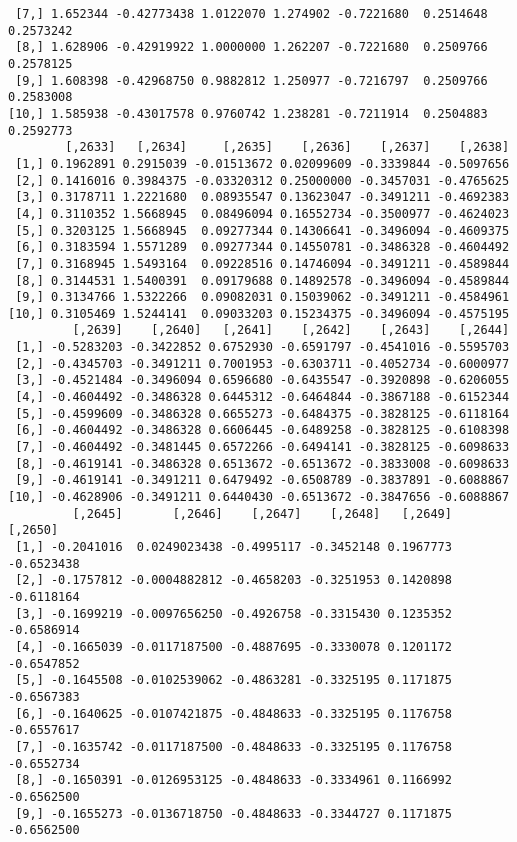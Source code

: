 \documentclass[
  letterpaper,
  DIV=11,
  numbers=noendperiod]{scrreprt}
\begin{document}
\begin{verbatim}
 [7,] 1.652344 -0.42773438 1.0122070 1.274902 -0.7221680  0.2514648  0.2573242
 [8,] 1.628906 -0.42919922 1.0000000 1.262207 -0.7221680  0.2509766  0.2578125
 [9,] 1.608398 -0.42968750 0.9882812 1.250977 -0.7216797  0.2509766  0.2583008
[10,] 1.585938 -0.43017578 0.9760742 1.238281 -0.7211914  0.2504883  0.2592773
        [,2633]   [,2634]     [,2635]    [,2636]    [,2637]    [,2638]
 [1,] 0.1962891 0.2915039 -0.01513672 0.02099609 -0.3339844 -0.5097656
 [2,] 0.1416016 0.3984375 -0.03320312 0.25000000 -0.3457031 -0.4765625
 [3,] 0.3178711 1.2221680  0.08935547 0.13623047 -0.3491211 -0.4692383
 [4,] 0.3110352 1.5668945  0.08496094 0.16552734 -0.3500977 -0.4624023
 [5,] 0.3203125 1.5668945  0.09277344 0.14306641 -0.3496094 -0.4609375
 [6,] 0.3183594 1.5571289  0.09277344 0.14550781 -0.3486328 -0.4604492
 [7,] 0.3168945 1.5493164  0.09228516 0.14746094 -0.3491211 -0.4589844
 [8,] 0.3144531 1.5400391  0.09179688 0.14892578 -0.3496094 -0.4589844
 [9,] 0.3134766 1.5322266  0.09082031 0.15039062 -0.3491211 -0.4584961
[10,] 0.3105469 1.5244141  0.09033203 0.15234375 -0.3496094 -0.4575195
         [,2639]    [,2640]   [,2641]    [,2642]    [,2643]    [,2644]
 [1,] -0.5283203 -0.3422852 0.6752930 -0.6591797 -0.4541016 -0.5595703
 [2,] -0.4345703 -0.3491211 0.7001953 -0.6303711 -0.4052734 -0.6000977
 [3,] -0.4521484 -0.3496094 0.6596680 -0.6435547 -0.3920898 -0.6206055
 [4,] -0.4604492 -0.3486328 0.6445312 -0.6464844 -0.3867188 -0.6152344
 [5,] -0.4599609 -0.3486328 0.6655273 -0.6484375 -0.3828125 -0.6118164
 [6,] -0.4604492 -0.3486328 0.6606445 -0.6489258 -0.3828125 -0.6108398
 [7,] -0.4604492 -0.3481445 0.6572266 -0.6494141 -0.3828125 -0.6098633
 [8,] -0.4619141 -0.3486328 0.6513672 -0.6513672 -0.3833008 -0.6098633
 [9,] -0.4619141 -0.3491211 0.6479492 -0.6508789 -0.3837891 -0.6088867
[10,] -0.4628906 -0.3491211 0.6440430 -0.6513672 -0.3847656 -0.6088867
         [,2645]       [,2646]    [,2647]    [,2648]   [,2649]    [,2650]
 [1,] -0.2041016  0.0249023438 -0.4995117 -0.3452148 0.1967773 -0.6523438
 [2,] -0.1757812 -0.0004882812 -0.4658203 -0.3251953 0.1420898 -0.6118164
 [3,] -0.1699219 -0.0097656250 -0.4926758 -0.3315430 0.1235352 -0.6586914
 [4,] -0.1665039 -0.0117187500 -0.4887695 -0.3330078 0.1201172 -0.6547852
 [5,] -0.1645508 -0.0102539062 -0.4863281 -0.3325195 0.1171875 -0.6567383
 [6,] -0.1640625 -0.0107421875 -0.4848633 -0.3325195 0.1176758 -0.6557617
 [7,] -0.1635742 -0.0117187500 -0.4848633 -0.3325195 0.1176758 -0.6552734
 [8,] -0.1650391 -0.0126953125 -0.4848633 -0.3334961 0.1166992 -0.6562500
 [9,] -0.1655273 -0.0136718750 -0.4848633 -0.3344727 0.1171875 -0.6562500

\end{verbatim}
\end{document}
